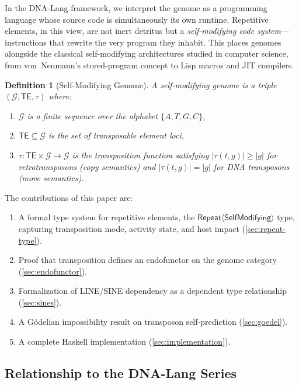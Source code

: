 \documentclass[12pt,a4paper]{article}
\newtheorem{definition}[theorem]{Definition}
\newcommand{\Genome}{\mathcal{G}}
\newcommand{\TE}{\mathsf{TE}}
\newcommand{\Repeat}{\mathsf{Repeat}}
\begin{document}
In the DNA-Lang framework, we interpret the genome as a programming language whose source
code is simultaneously its own runtime. Repetitive elements, in this view, are not inert
detritus but a \emph{self-modifying code system}---instructions that rewrite the very
program they inhabit. This places genomes alongside the classical self-modifying
architectures studied in computer science, from von~Neumann's stored-program concept to
Lisp macros and JIT compilers.

\begin{definition}[Self-Modifying Genome]\label{def:selfmod}
A \emph{self-modifying genome} is a triple $(\Genome, \TE, \tau)$ where:
\begin{enumerate}[label=(\roman*)]
  \item $\Genome$ is a finite sequence over the alphabet $\{A, T, G, C\}$,
  \item $\TE \subseteq \Genome$ is the set of transposable element loci,
  \item $\tau : \TE \times \Genome \to \Genome$ is the transposition function satisfying
    $|\tau(t,g)| \geq |g|$ for retrotransposons (copy semantics) and
    $|\tau(t,g)| = |g|$ for DNA transposons (move semantics).
\end{enumerate}
\end{definition}

The contributions of this paper are:
\begin{enumerate}[label=\arabic*.]
  \item A formal type system for repetitive elements, the $\Repeat\langle\mathsf{SelfModifying}\rangle$ type, capturing transposition mode, activity state, and host impact (\cref{sec:repeat-type}).
  \item Proof that transposition defines an endofunctor on the genome category (\cref{sec:endofunctor}).
  \item Formalization of LINE/SINE dependency as a dependent type relationship (\cref{sec:sines}).
  \item A G\"odelian impossibility result on transposon self-prediction (\cref{sec:goedel}).
  \item A complete Haskell implementation (\cref{sec:implementation}).
\end{enumerate}

\subsection{Relationship to the DNA-Lang Series}
\end{document}
